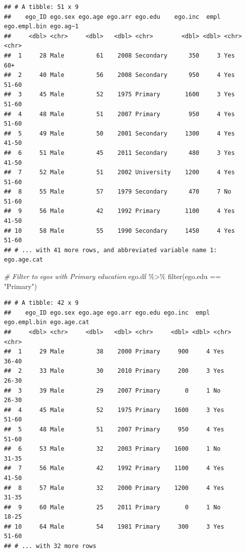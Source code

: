 \documentclass[
]{book}
\newenvironment{Shaded}{\begin{snugshade}}{\end{snugshade}}
\newcommand{\CommentTok}[1]{\textcolor[rgb]{0.56,0.35,0.01}{\textit{#1}}}
\newcommand{\FunctionTok}[1]{\textcolor[rgb]{0.00,0.00,0.00}{#1}}
\newcommand{\NormalTok}[1]{#1}
\newcommand{\SpecialCharTok}[1]{\textcolor[rgb]{0.00,0.00,0.00}{#1}}
\newcommand{\StringTok}[1]{\textcolor[rgb]{0.31,0.60,0.02}{#1}}
\begin{document}
\begin{verbatim}
## # A tibble: 51 x 9
##    ego_ID ego.sex ego.age ego.arr ego.edu    ego.inc  empl ego.empl.bin ego.ag~1
##     <dbl> <chr>     <dbl>   <dbl> <chr>        <dbl> <dbl> <chr>        <chr>   
##  1     28 Male         61    2008 Secondary      350     3 Yes          60+     
##  2     40 Male         56    2008 Secondary      950     4 Yes          51-60   
##  3     45 Male         52    1975 Primary       1600     3 Yes          51-60   
##  4     48 Male         51    2007 Primary        950     4 Yes          51-60   
##  5     49 Male         50    2001 Secondary     1300     4 Yes          41-50   
##  6     51 Male         45    2011 Secondary      480     3 Yes          41-50   
##  7     52 Male         51    2002 University    1200     4 Yes          51-60   
##  8     55 Male         57    1979 Secondary      470     7 No           51-60   
##  9     56 Male         42    1992 Primary       1100     4 Yes          41-50   
## 10     58 Male         55    1990 Secondary     1450     4 Yes          51-60   
## # ... with 41 more rows, and abbreviated variable name 1: ego.age.cat
\end{verbatim}

\begin{Shaded}
\begin{Highlighting}[]
\CommentTok{\# Filter to egos with Primary education}
\NormalTok{ego.df }\SpecialCharTok{\%\textgreater{}\%}
  \FunctionTok{filter}\NormalTok{(ego.edu }\SpecialCharTok{==} \StringTok{"Primary"}\NormalTok{)}
\end{Highlighting}
\end{Shaded}

\begin{verbatim}
## # A tibble: 42 x 9
##    ego_ID ego.sex ego.age ego.arr ego.edu ego.inc  empl ego.empl.bin ego.age.cat
##     <dbl> <chr>     <dbl>   <dbl> <chr>     <dbl> <dbl> <chr>        <chr>      
##  1     29 Male         38    2000 Primary     900     4 Yes          36-40      
##  2     33 Male         30    2010 Primary     200     3 Yes          26-30      
##  3     39 Male         29    2007 Primary       0     1 No           26-30      
##  4     45 Male         52    1975 Primary    1600     3 Yes          51-60      
##  5     48 Male         51    2007 Primary     950     4 Yes          51-60      
##  6     53 Male         32    2003 Primary    1600     1 No           31-35      
##  7     56 Male         42    1992 Primary    1100     4 Yes          41-50      
##  8     57 Male         32    2000 Primary    1200     4 Yes          31-35      
##  9     60 Male         25    2011 Primary       0     1 No           18-25      
## 10     64 Male         54    1981 Primary     300     3 Yes          51-60      
## # ... with 32 more rows
\end{verbatim}
\end{document}
